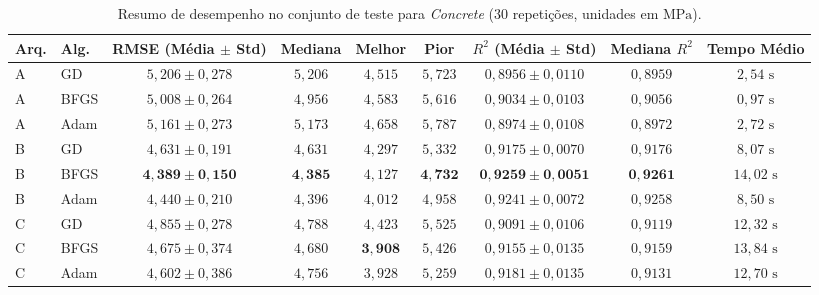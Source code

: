 \documentclass[conference]{IEEEtran}
\begin{document}
\begin{table}[htbp]
\caption{Resumo de desempenho no conjunto de teste para \textit{Concrete} ($30$ repetições, unidades em $\text{MPa}$).}
\label{tab:res_concrete}
\centering
\scriptsize
\begin{tabular}{@{}llccccccc@{}}
\toprule
\textbf{Arq.} & \textbf{Alg.} & \textbf{RMSE (Média $\pm$ Std)} & \textbf{Mediana} & \textbf{Melhor} & \textbf{Pior} & \textbf{$R^2$ (Média $\pm$ Std)} & \textbf{Mediana $R^2$} & \textbf{Tempo Médio} \\
\midrule
A & GD   & $5{,}206 \pm 0{,}278$ & $5{,}206$ & $4{,}515$ & $5{,}723$ & $0{,}8956 \pm 0{,}0110$ & $0{,}8959$ & $2{,}54\text{ s}$ \\
A & BFGS & $5{,}008 \pm 0{,}264$ & $4{,}956$ & $4{,}583$ & $5{,}616$ & $0{,}9034 \pm 0{,}0103$ & $0{,}9056$ & $0{,}97\text{ s}$ \\
A & Adam & $5{,}161 \pm 0{,}273$ & $5{,}173$ & $4{,}658$ & $5{,}787$ & $0{,}8974 \pm 0{,}0108$ & $0{,}8972$ & $2{,}72\text{ s}$ \\
\midrule
B & GD   & $4{,}631 \pm 0{,}191$ & $4{,}631$ & $4{,}297$ & $5{,}332$ & $0{,}9175 \pm 0{,}0070$ & $0{,}9176$ & $8{,}07\text{ s}$ \\
B & BFGS & $\mathbf{4{,}389 \pm 0{,}150}$ & $\mathbf{4{,}385}$ & $4{,}127$ & $\mathbf{4{,}732}$ & $\mathbf{0{,}9259 \pm 0{,}0051}$ & $\mathbf{0{,}9261}$ & $14{,}02\text{ s}$ \\
B & Adam & $4{,}440 \pm 0{,}210$ & $4{,}396$ & $4{,}012$ & $4{,}958$ & $0{,}9241 \pm 0{,}0072$ & $0{,}9258$ & $8{,}50\text{ s}$ \\
\midrule
C & GD   & $4{,}855 \pm 0{,}278$ & $4{,}788$ & $4{,}423$ & $5{,}525$ & $0{,}9091 \pm 0{,}0106$ & $0{,}9119$ & $12{,}32\text{ s}$ \\
C & BFGS & $4{,}675 \pm 0{,}374$ & $4{,}680$ & $\mathbf{3{,}908}$ & $5{,}426$ & $0{,}9155 \pm 0{,}0135$ & $0{,}9159$ & $13{,}84\text{ s}$ \\
C & Adam & $4{,}602 \pm 0{,}386$ & $4{,}756$ & $3{,}928$ & $5{,}259$ & $0{,}9181 \pm 0{,}0135$ & $0{,}9131$ & $12{,}70\text{ s}$ \\
\bottomrule
\end{tabular}
\end{table}
\end{document}
